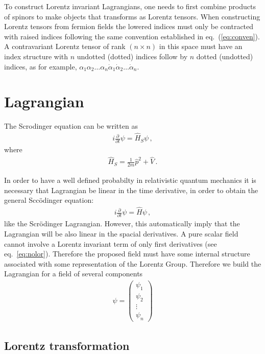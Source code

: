 To construct Lorentz invariant Lagrangians, one needs to first combine products of spinors to make objects that transforms as Lorentz tensors.
When constructing Lorentz  tensors from fermion fields the lowered indices must only be contracted with raised indices following the same convention established in eq.~(\ref{eq:conven}). A contravariant  Lorentz tensor of rank $(n\times n)$  in this space must have an index structure with $n$ undotted (dotted) indices follow by $n$ dotted (undotted) indices, as for example,   $\alpha_1\alpha_2\ldots\alpha_n\dot{\alpha}_1\dot{\alpha}_2\ldots\dot{\alpha}_n$.

\section{Lagrangian}
\label{sec:dirac-equation}
The Scrodinger equation can be written as
\begin{align}
    i\frac{\partial}{\partial t}\psi=\hat{H}_{S} \psi\,,  
\end{align}
where
\begin{align}
  \hat{H}_{S}=\frac{1}{2m}\hat p^2+\widehat V\,.
\end{align}


In order to have a well defined probabilty in relativistic quantum mechanics it is necessary that Lagrangian be linear in the time derivative, in order to obtain the general Sccödinger equation:
\begin{align}
  i\frac{\partial}{\partial t}\psi=\hat{H} \psi\,,  
\end{align}
like the Scrödinger Lagrangian. However, this automatically imply that the Lagrangian will be also linear in the spacial derivatives. A pure scalar field cannot involve a Lorentz invariant term of only first derivatives (see eq.~\eqref{eq:nolor}). Therefore the proposed field must have some internal structure associated with some representation of the Lorentz Group. Therefore we build the Lagrangian for a field of several components
\begin{align}
  \psi=  \begin{pmatrix}
\psi_1\\
\psi_2\\
\vdots\\
\psi_n    
  \end{pmatrix}
\end{align}

\subsection{Lorentz transformation}

